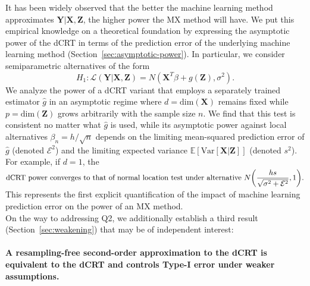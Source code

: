 \documentclass[12pt]{article}
\theoremstyle{definition}
\theoremstyle{remark}
\newcommand{\prx}{\bm X}
\newcommand{\prz}{\bm Z}
\newcommand{\pry}{{\bm Y}}
\begin{document}
It has been widely observed that the better the machine learning method approximates $\pry|\prx,\prz$, the higher power the MX method will have. We put this empirical knowledge on a theoretical foundation by expressing the asymptotic power of the dCRT in terms of the prediction error of the underlying machine learning method (Section~\ref{sec:asymptotic-power}). In particular, we consider semiparametric alternatives of the form
\begin{equation}
	H_1: \mathcal L(\pry|\prx,\prz) = N(\prx^T\beta + g(\prz),\sigma^2).
	\label{parametric-alternative-intro}
\end{equation}
We analyze the power of a dCRT variant that employs a separately trained estimator $\widehat g$ in an asymptotic regime where $d = \text{dim}(\prx)$ remains fixed while $p = \text{dim}(\prz)$ grows arbitrarily with the sample size $n$. We find that this test is consistent no matter what $\widehat g$ is used, while its asymptotic power against local alternatives $\beta_n = h/\sqrt{n}$ depends on the limiting mean-squared prediction error of $\widehat g$ (denoted $\mathcal E^2$) and the limiting expected variance $\mathbb E[\text{Var}[\prx | \prz]]$ (denoted $s^2$). For example, if $d = 1$, the
\begin{equation*}
	\begin{split}
		\text{dCRT power converges to that of normal location test under alternative } N\smash{\left(\frac{hs}{\sqrt{\sigma^2 + \mathcal E^2}},1\right)}.
	\end{split}
\end{equation*}
This represents the first explicit quantification of the impact of machine learning prediction error on the power of an MX method. \\

On the way to addressing Q2, we additionally establish a third result (Section~\ref{sec:weakening}) that may be of independent interest:

\paragraph{A resampling-free second-order approximation to the dCRT is equivalent to the dCRT and controls Type-I error under weaker assumptions.}
\end{document}
